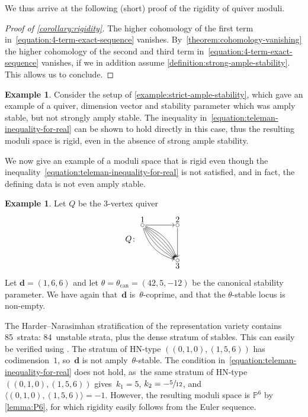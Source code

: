 \documentclass[11pt]{article}
\theoremstyle{plain}
\theoremstyle{definition}
\newtheorem{example}[theorem]{Example}
\newcommand\can{\ensuremath{\mathrm{can}}}
\newcommand\dash{\nobreakdash-\hspace{0pt}}
\newcommand\tuple[1]{\ensuremath{{\boldsymbol{#1}}}}
\begin{document}
We thus arrive at the following (short) proof of the rigidity of quiver moduli.

\begin{proof}[Proof of \cref{corollary:rigidity}]
The higher cohomology of the first term in~\eqref{equation:4-term-exact-sequence} vanishes. By~\cref{theorem:cohomology-vanishing} the higher cohomology of the second and third term in~\eqref{equation:4-term-exact-sequence} vanishes,
if we in addition assume \cref{definition:strong-ample-stability}.
This allows us to conclude.
\end{proof}

\begin{example}
\label{example:strict-ample-stability-rigid}
Consider the setup of \cref{example:strict-ample-stability},
which gave an example of a quiver, dimension vector and stability parameter
which was amply stable, but not strongly amply stable.
The inequality in~\eqref{equation:teleman-inequality-for-real} can be shown to hold directly in this case,
thus the resulting moduli space is rigid, even in the absence of strong ample stability.
\end{example}

We now give an example of a moduli space that is rigid
even though the inequality~\eqref{equation:teleman-inequality-for-real} is not satisfied,
and in fact, the defining data is not even amply stable.
\begin{example}
\label{example:no-teleman-still-rigid}
Let $Q$ be the $3$-vertex quiver
\begin{equation}
Q\colon
\begin{tikzpicture}[baseline = -20pt, node distance = 1.5cm]
\node (1) {};
\node (2) [right of = 1] {};
\node (3) [below of = 2] {};
\draw (1) circle (2pt) node[above] {1};
\draw (2) circle (2pt) node[above] {2};
\draw (3) circle (2pt) node[below] {3};
\draw[->] (1) edge (2);
\draw[->, bend left = 25] (1) edge (3);
\draw[->, bend left = 15] (1) edge (3);
\draw[->, bend left = 5] (1) edge (3);
\draw[->, bend right = 5] (1) edge (3);
\draw[->, bend right = 15] (1) edge (3);
\draw[->, bend right = 30] (1) edge (3);
\draw[->] (2) edge (3);
\end{tikzpicture}
\end{equation}
Let $\tuple{d} = (1,6,6)$ and let $\theta = \theta_\can = (42,5,-12)$ be the canonical stability parameter.
We have again that~$\tuple{d}$ is~$\theta$\dash coprime, and that the $\theta$-stable locus is non-empty.

The Harder--Narasimhan stratification of the representation variety contains 85~strata:
84~unstable strata, plus the dense stratum of stables.
This can easily be verified using \cite{quivertools}.
The stratum of HN-type $((0,1,0), (1,5,6))$ has codimension~$1$, so~$\tuple{d}$ is not amply~$\theta$-stable.
The condition in~\eqref{equation:teleman-inequality-for-real} does not hold, as~the same stratum of HN-type $((0,1,0), (1,5,6))$ gives~$k_1 = 5$, $k_2 = -\sfrac{5}{12}$,
and~$\langle (0,1,0),(1,5,6) \rangle = -1$.
However, the resulting moduli space is $\mathbb{P}^6$ by \cref{lemma:P6},
for which rigidity easily follows from the Euler sequence.
\end{example}
\end{document}
